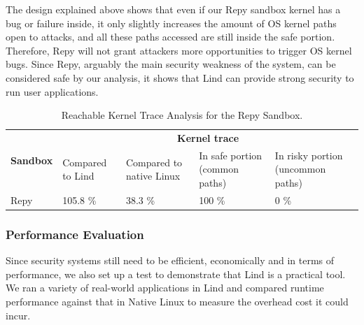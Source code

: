 The design explained above shows that even if our Repy sandbox kernel has a
bug or failure inside, 
it only slightly increases the amount of OS kernel paths open to attacks,
and all these paths accessed are still inside the safe portion. 
Therefore, Repy will not grant attackers more opportunities to trigger OS
kernel bugs. 
Since Repy, arguably the main security weakness of the system, can be
considered safe by our analysis, 
it shows that Lind can provide strong security to run user applications.

\begin{table}
\centering
\scriptsize
\caption{Reachable Kernel Trace Analysis for the Repy Sandbox. }
\begin{tabular}{|l|l|l|l|l|}
  \hline
  \multirow{3}{.8cm}{\bf Sandbox} & \multicolumn{4}{c|}{\bf Kernel trace} \\ \cline{2-5}
  & \multirow{2}{1cm}{Compared to Lind} & 
  \multirow{2}{1.3cm}{Compared to native Linux} & \multirow{2}{1.7cm}{In safe portion 
  (common paths)} & \multirow{2}{1.9cm}{In risky portion (uncommon paths)} \\
  & & & & \\  \hline
  
  Repy & 105.8 \% & 38.3 \% & 100 \%  & 0 \%  \\
  \hline
\end{tabular}
\label{table:trace-Repy}
\end{table}

\subsubsection{Performance Evaluation}
\label{Performance-Evaluation}

Since security systems still need to be efficient, economically and in
terms of performance, 
we also set up a test to demonstrate that Lind is a practical tool. 
We ran a variety of real-world applications in Lind and compared runtime
performance 
against that in Native Linux to measure the overhead cost it could incur.

